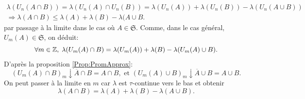 \begin{demo}
\begin{multline*}
 \lambda(U_n(A\cap B)) = \lambda(U_n(A) \cap U_n(B)) = \lambda(U_n(A)) + \lambda(U_n(B)) - \lambda(U_n(A\cup B))\\
 \Rightarrow
 \lambda(A \cap B) \leq \lambda(A) + \lambda(B) - \lambda(A \cup B.
\end{multline*}
par passage à la limite dans le cas où $A \in \mathfrak{S}$. Comme, dans le cas général, $U_m(A) \in \mathfrak{S}$, on déduit:
\begin{displaymath}
 \forall m \in \mathbb{Z}, \; \lambda(U_m(A) \cap B) = \lambda(U_m(A)) + \lambda(B) - \lambda(U_m(A) \cup B).
\end{displaymath}
D'après la proposition \ref{Prop:PromApprox}:
\begin{displaymath}
 \left( U_m(A) \cap B \right)_m \downarrow \overline{A} \cap B = A \cap B, \text{ et } \left( U_m(A) \cup B \right)_m \downarrow \overline{A} \cup B = A \cup B.
\end{displaymath}
On peut passer à la limite en $m$ car $\lambda$ est $\tau$-continue vers le bas et obtenir
\begin{displaymath}
  \lambda(A \cap B) = \lambda(A) + \lambda(B) - \lambda(A \cup B).
\end{displaymath}
\end{demo}

